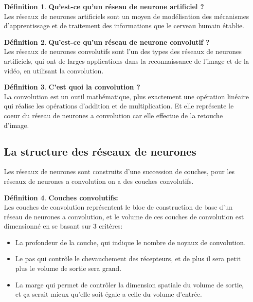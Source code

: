 \documentclass[a4paper,11pt]{report}
\theoremstyle{definition}
\newtheorem{defin}{Définition}[chapter]
\begin{document}
\begin{defin}{\textbf{Qu'est-ce qu'un réseau de neurone artificiel ?}} \\

Les réseaux de neurones artificiels sont un moyen de modélisation des mécanismes d'apprentissage et de traitement des informations que le cerveau humain établie. \cite{ref10}
\end{defin}


\begin{defin}{\textbf{Qu'est-ce qu'un réseau de neurone convolutif ?}} \\

Les réseaux de neurones convolutifs sont l'un des types des réseaux de neurones artificiels, qui ont de larges applications dans la reconnaissance de l'image et de la vidéo, en utilisant la convolution. \cite{ref8}
\end{defin}


\begin{defin}{\textbf{C'est quoi la convolution ?}} \\

La convolution est un outil mathématique, plus exactement une opération linéaire qui réalise les opérations d'addition et de multiplication. Et elle représente le coeur du réseau de neurones a convolution car elle effectue de la retouche d'image. \cite{ref7}
\end{defin}


\newpage
\subsection{La structure des réseaux de neurones}

Les réseaux de neurones sont construits d'une succession de couches, pour les réseaux de neurones a convolution on a des couches convolutifs. \cite{ref6} \\

\begin{defin}{\textbf{Couches convolutifs:}} \\

 Les couches de convolution représentent le bloc de construction de base d'un réseau de neurones a convolution, et le volume de ces couches de convolution est dimensionné en se basant sur 3 critères: \\
    
    \begin{itemize}
        \item [\cdot] La profondeur de la couche, qui indique le nombre de noyaux de convolution.
        \item [\cdot] Le pas qui contrôle le chevauchement des récepteurs, et de plus il sera petit plus le volume de sortie sera grand.
        \item [\cdot] La marge qui permet de contrôler la dimension spatiale du volume de sortie, et ça serait mieux qu'elle soit égale a celle du volume d'entrée.\\
    \end{itemize}
\end{defin}
\end{document}
